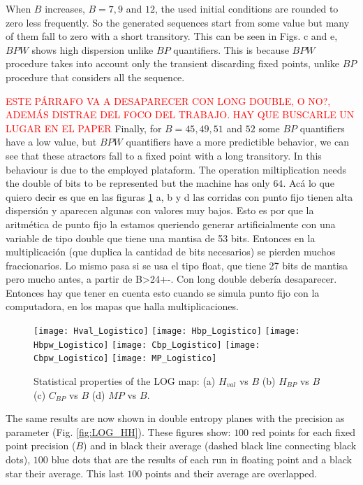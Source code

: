 When $B$ increases, $B=7, 9$ and $12$, the used initial conditions are rounded to zero less frequently.
So the generated sequences start from some value but many of them fall to zero with a short transitory.
This can be seen in Figs. c and e, $BPW$ shows high dispersion unlike $BP$ quantifiers.
This is because $BPW$ procedure takes into account only the transient discarding fixed points, unlike $BP$ procedure that considers all the sequence. 
 
\textcolor{red}{ESTE PÁRRAFO VA A DESAPARECER CON LONG DOUBLE, O NO?, ADEMÁS DISTRAE DEL FOCO DEL TRABAJO. HAY QUE BUSCARLE UN LUGAR EN EL PAPER}
Finally, for $B = 45, 49, 51$ and $52$ some $BP$ quantifiers have a low value, but $BPW$ quantifiers have a more predictible behavior, we can see that these atractors fall to a fixed point with a long transitory.
In this behaviour is due to the employed plataform.
The operation miltiplication needs the double of bits to be represented but the machine has only $64$.
Acá lo que quiero decir es que en las figuras \ref{fig:LOG_QuantiB} a, b y d las corridas con punto fijo tienen alta dispersión y aparecen algunas con valores muy bajos.
Esto es por que la aritmética de punto fijo la estamos queriendo generar artificialmente con una variable de tipo double que tiene una mantisa de 53 bits.
Entonces en la multiplicación (que duplica la cantidad de bits necesarios) se pierden muchos fraccionarios.
Lo mismo pasa si se usa el tipo float, que tiene 27 bits de mantisa pero mucho antes, a partir de B>24+-.
Con long double debería desaparecer.
Entonces hay que tener en cuenta esto cuando se simula punto fijo con la computadora, en los mapas que halla multiplicaciones.

\begin{figure}
	\texttt{[image: Hval\_Logistico]}
	\texttt{[image: Hbp\_Logistico]}
	\texttt{[image: Hbpw\_Logistico]}
	\texttt{[image: Cbp\_Logistico]}
	\texttt{[image: Cbpw\_Logistico]}
	\texttt{[image: MP\_Logistico]}
	\caption{Statistical properties of the LOG map: (a) $H_{val}$ vs $B$ (b) $H_{BP}$ vs $B$ (c) $C_{BP}$ vs $B$ (d) $MP$ vs $B$.}
	\label{fig:LOG_QuantiB}
\end{figure}

The same results are now shown in double entropy planes with the precision as parameter (Fig. \ref{fig:LOG_HH}).
These figures show: $100$ red points for each fixed point precision ($B$) and in black their average (dashed black line connecting black dots), $100$ blue dots that are the results of each run in floating point and a black star their average.
This last $100$ points and their average are overlapped.

